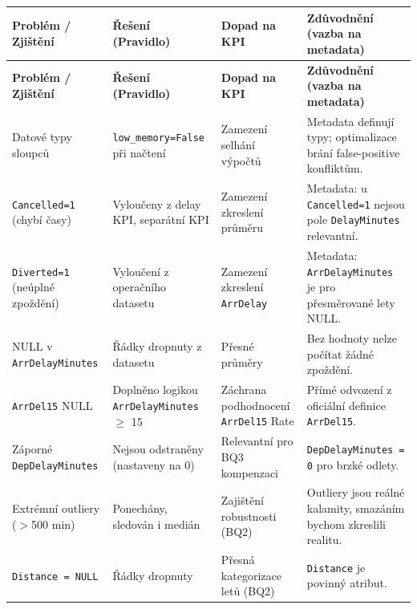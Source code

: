 \documentclass{protokol}
\begin{document}

\begin{longtable}{|>{\RaggedRight}p{3.2cm}|>{\RaggedRight}p{3.6cm}|>{\RaggedRight}p{3.0cm}|>{\RaggedRight}p{4.2cm}|}
\hline
\rowcolor{headergray}
\textbf{Problém / Zjištění} & \textbf{Řešení (Pravidlo)} & \textbf{Dopad na KPI} & \textbf{Zdůvodnění (vazba na metadata)} \\
\hline
\endfirsthead
\hline
\rowcolor{headergray}
\textbf{Problém / Zjištění} & \textbf{Řešení (Pravidlo)} & \textbf{Dopad na KPI} & \textbf{Zdůvodnění (vazba na metadata)} \\
\hline
\endhead
\hline
\endfoot

Datové typy sloupců
& \texttt{low\_memory=False} při načtení
& Zamezení selhání výpočtů
& Metadata definují typy; optimalizace brání false-positive konfliktům. \\[2pt]
\hline

\texttt{Cancelled=1} (chybí časy)
& Vyloučeny z delay KPI, separátní KPI
& Zamezení zkreslení průměru
& Metadata: u \texttt{Cancelled=1} nejsou pole \texttt{DelayMinutes} relevantní. \\[2pt]
\hline

\texttt{Diverted=1} (neúplné zpoždění)
& Vyloučení z operačního datasetu
& Zamezení zkreslení \texttt{ArrDelay}
& Metadata: \texttt{ArrDelayMinutes} je pro přesměrované lety NULL. \\[2pt]
\hline

NULL v \texttt{ArrDelayMinutes}
& Řádky dropnuty z datasetu
& Přesné průměry
& Bez hodnoty nelze počítat žádné zpoždění. \\[2pt]
\hline

\texttt{ArrDel15} NULL
& Doplněno logikou \texttt{ArrDelayMinutes} $\geq$ 15
& Záchrana podhodnocení \texttt{ArrDel15} Rate
& Přímé odvození z oficiální definice \texttt{ArrDel15}. \\[2pt]
\hline

Záporné \texttt{DepDelayMinutes}
& Nejsou odstraněny (nastaveny na 0)
& Relevantní pro BQ3 kompenzaci
& \texttt{DepDelayMinutes = 0} pro brzké odlety. \\[2pt]
\hline

Extrémní outliery ($>$500 min)
& Ponechány, sledován i medián
& Zajištění robustnosti (BQ2)
& Outliery jsou reálné kalamity, smazáním bychom zkreslili realitu. \\[2pt]
\hline

\texttt{Distance = NULL}
& Řádky dropnuty
& Přesná kategorizace letů (BQ2)
& \texttt{Distance} je povinný atribut. \\

\end{longtable}
\end{document}
